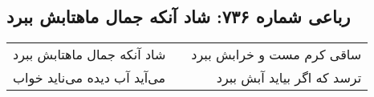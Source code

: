 \begin{center}
\section*{رباعی شماره ۷۳۶: شاد آنکه جمال ماهتابش ببرد}
\label{sec:0736}
\begin{longtable}{l p{0.5cm} r}
شاد آنکه جمال ماهتابش ببرد
&&
ساقی کرم مست و خرابش ببرد
\\
می‌آید آب دیده می‌ناید خواب
&&
ترسد که اگر بیاید آبش ببرد
\\
\end{longtable}
\end{center}
